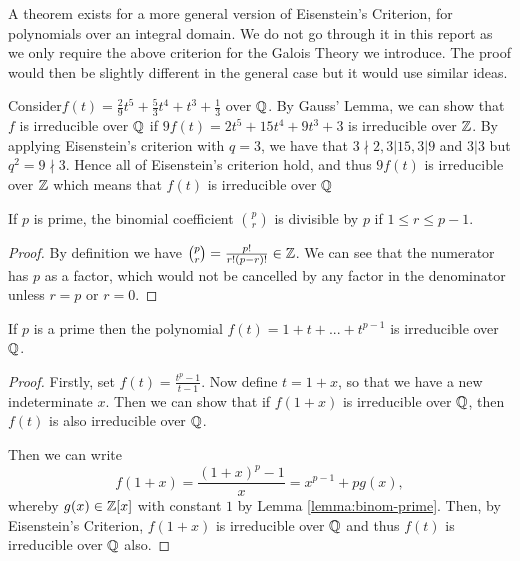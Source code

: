 A theorem exists for a more general version of Eisenstein's Criterion, for polynomials over an integral domain. We do not go through it in this report as we only require the above criterion for the Galois Theory we introduce. The proof would then be slightly different in the general case but it would use similar ideas.

\begin{example}
Consider$
f(t) = \frac{2}{9} t^5 + \frac{5}{3} t^4 + t^3 + \frac{1}{3}$ over $\mathbb Q$. By Gauss' Lemma, we can show that $f$ is irreducible over $\mathbb Q$ if $
9f(t) = 2t^5 + 15t^4 + 9t^3 + 3
$ is irreducible over $\mathbb Z$. By applying Eisenstein's criterion with $q = 3$, we have that $3 \nmid 2, 3|15, 3|9 $ and $3|3$ but $q^2 = 9 \nmid 3$. Hence all of Eisenstein's criterion hold, and thus $9f(t)$ is irreducible over $\mathbb Z$ which means that $f(t)$ is irreducible over $\mathbb Q$

\end{example}

\begin{lemma} \label{lemma:binom-prime}
If $p$ is prime, the binomial coefficient $\binom{p}{r}$ is divisible by $p$ if $1 \le r \le p-1$.
\end{lemma}

\begin{proof}
By definition we have $\binom{p}{r} = \frac{p!}{r!(p-r)!} \in \mathbb Z$. We can see that the numerator has $p$ as a factor, which would not be cancelled by any factor in the denominator unless $r=p$ or $r=0$.
\end{proof}

\begin{theorem}\label{thm:irreducible-prime-polynomial}
    If $p$ is a prime then the polynomial
    $
    f(t) = 1 + t + ... + t^{p-1}
    $
    is irreducible over $\mathbb Q$.
\end{theorem}

\begin{proof}
Firstly, set $f(t) = \frac{t^p - 1}{t - 1}$. 
Now define $t =1+x$, so that we have a new indeterminate $x$. Then we can show that if $f(1+x)$ is irreducible over $\mathbb Q$, then $f(t)$ is also irreducible over $\mathbb Q$.

Then we can write $$f(1+x)=\frac{(1+x)^p - 1}{x}  = x^{p-1} + pg(x),$$ whereby $g(x)\in \mathbb Z[x]$ with constant $1$ by Lemma \ref{lemma:binom-prime}. Then, by Eisenstein's Criterion, $f(1+x)$ is irreducible over $\mathbb Q$ and thus $f(t)$ is irreducible over $\mathbb Q$ also.

\end{proof}



